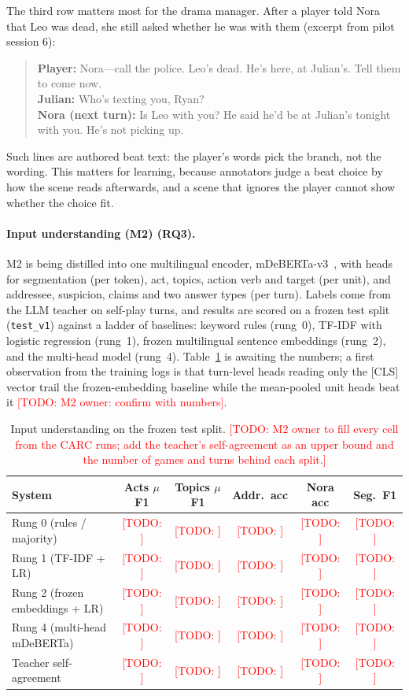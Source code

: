 \documentclass{article}
\newcommand{\todo}[1]{\textcolor{red}{[TODO: #1]}}
\begin{document}
The third row matters most for the drama manager. After a player told Nora that Leo was dead, she still asked whether he was with them (excerpt from pilot session 6):
\begin{quote}\small
\textbf{Player:} Nora---call the police. Leo's dead. He's here, at Julian's. Tell them to come now.\\
\textbf{Julian:} Who's texting you, Ryan?\\
\textbf{Nora (next turn):} Is Leo with you? He said he'd be at Julian's tonight with you. He's not picking up.
\end{quote}
Such lines are authored beat text: the player's words pick the branch, not the wording. This matters for learning, because annotators judge a beat choice by how the scene reads afterwards, and a scene that ignores the player cannot show whether the choice fit.

\paragraph{Input understanding (M2) (RQ3).}
M2 is being distilled into one multilingual encoder, mDeBERTa-v3~\citep{he2023debertav3}, with heads for segmentation (per token), act, topics, action verb and target (per unit), and addressee, suspicion, claims and two answer types (per turn). Labels come from the LLM teacher on self-play turns, and results are scored on a frozen test split (\texttt{test\_v1}) against a ladder of baselines: keyword rules (rung~0), TF-IDF with logistic regression (rung~1), frozen multilingual sentence embeddings (rung~2), and the multi-head model (rung~4). Table~\ref{tab:m2} is awaiting the numbers; a first observation from the training logs is that turn-level heads reading only the [CLS] vector trail the frozen-embedding baseline while the mean-pooled unit heads beat it \todo{M2 owner: confirm with numbers}.

\begin{table}[t]
\centering\small
\caption{Input understanding on the frozen test split. \todo{M2 owner to fill every cell from the CARC runs; add the teacher's self-agreement as an upper bound and the number of games and turns behind each split.}}
\label{tab:m2}
\setlength{\tabcolsep}{3pt}
\begin{tabular}{lccccc}
\toprule
System & Acts $\mu$F1 & Topics $\mu$F1 & Addr.\ acc & Nora acc & Seg.\ F1 \\
\midrule
Rung 0 (rules / majority) & \todo{} & \todo{} & \todo{} & \todo{} & \todo{} \\
Rung 1 (TF-IDF + LR) & \todo{} & \todo{} & \todo{} & \todo{} & \todo{} \\
Rung 2 (frozen embeddings + LR) & \todo{} & \todo{} & \todo{} & \todo{} & \todo{} \\
Rung 4 (multi-head mDeBERTa) & \todo{} & \todo{} & \todo{} & \todo{} & \todo{} \\
Teacher self-agreement & \todo{} & \todo{} & \todo{} & \todo{} & \todo{} \\
\bottomrule
\end{tabular}
\end{table}
\end{document}
